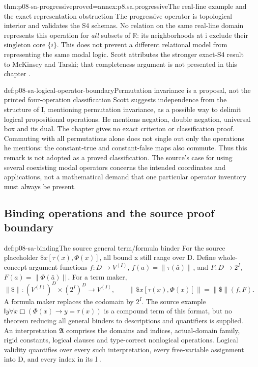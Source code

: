 \begin{hbtheorem}{thm:p08-sa-progressive}{proved=annex:p8.sa.progressive}{The real-line example and the exact representation obstruction}
The progressive operator is topological interior and validates the S4
schemas. No relation on the same real-line domain represents this operation
for \emph{all} subsets of \(\mathbb R\): its neighborhoods at i
exclude their singleton core \(\{i\}\). This does not prevent a
different relational model from representing the same modal logic.
Scott attributes the stronger exact-S4 result to McKinsey and Tarski;
that completeness argument is not presented in this chapter
\cite[p.~160]{Scott1970}.
\end{hbtheorem}

\begin{hbwarning}{def:p08-sa-logical-operator-boundary}{Permutation invariance is a proposal, not the printed four-operation classification}
Scott suggests independence from the structure of I, mentioning permutation
invariance, as a possible way to delimit logical propositional operations.
He mentions negation, double negation, universal box and its dual.
The chapter gives no exact criterion or classification proof. Commuting
with all permutations alone does not single out only the operations he
mentions: the constant-true and constant-false maps also commute. Thus
this remark is not adopted as a proved classification. The source's
case for using several coexisting modal operators concerns the intended
coordinates and applications, not a mathematical demand that one
particular operator inventory must always be present.
\end{hbwarning}

\subsection{Binding operations and the source proof boundary}

\begin{hbdefinition}{def:p08-sa-binding}{The source general term/formula binder}
For the source placeholder \(\$x[\tau(x),\Phi(x)]\), all
bound x still range over D. Define whole-concept argument functions
\(f:D\to V^{(I)}\), \(f(a)=\|\tau(\bar a)\|\), and
\(F:D\to2^I\), \(F(a)=\|\Phi(\bar a)\|\).
For a term maker,
\[
 \|\$\|:(V^{(I)})^D\times(2^I)^D\to V^{(I)},\qquad
 \|\$x[\tau(x),\Phi(x)]\|=\|\$\|(f,F).
\]
A formula maker replaces the codomain by \(2^I\).
The source example \(\mathsf I y\forall x\Box(\Phi(x)\to y=\tau(x))\)
is a compound term of this format, but no theorem reducing all general
binders to descriptions and quantifiers is supplied. An interpretation
\(\mathfrak A\) comprises the domains and indices, actual-domain
family, rigid constants, logical clauses and type-correct nonlogical
operations. Logical validity quantifies over every such interpretation,
every free-variable assignment into D, and every index in its I
\cite[\S V, pp.~161--165]{Scott1970}.
\end{hbdefinition}

